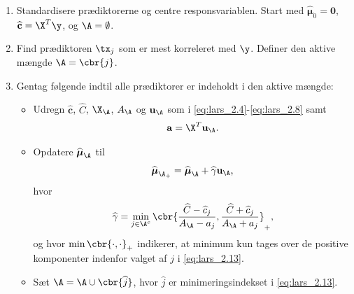\begin{alg} 
\begin{enumerate}
\item Standardisere prædiktorerne og centre responsvariablen. 
Start med \(\widehat{\boldsymbol{\mu}}_0 = \mathbf{0}\), \(\widehat{\mathbf{c}} = \X^T \y\), og \(\A = \emptyset\).
\item Find prædiktoren \(\tx_j\) som er mest korreleret med \(\y\). Definer den aktive mængde \(\A = \cbr{j}\).
\item 
Gentag følgende indtil alle prædiktorer er indeholdt i den aktive mængde:
\begin{itemize}
\item Udregn \(\widehat{\mathbf{c}}\), \(\widehat{C}\), \(\X_\A\), \(A_\A\) og \(\mathbf{u}_\A\) som i \eqref{eq:lars_2.4}-\eqref{eq:lars_2.8} samt
\begin{align*}
\mathbf{a} = \X^T \mathbf{u}_\A.
\end{align*}
\item Opdatere \(\widehat{\boldsymbol{\mu}}_\A\) til
\begin{align}
\widehat{\boldsymbol{\mu}}_{\A_+} = \widehat{\boldsymbol{\mu}}_\A + \widehat{\gamma} \mathbf{u}_\A, \label{eq:lars_2.12}
\end{align}
hvor 
\begin{align}
\widehat{\gamma} = \min_{j \in \A^c} \cbr{ \frac{\widehat{C}- \widehat{c}_j}{A_\A - a_j} , \frac{\widehat{C} + \widehat{c}_j}{A_\A + a_j}}_+, \label{eq:lars_2.13}
\end{align}
og hvor \(\min \cbr{\cdot , \cdot}_+\) indikerer, at minimum kun tages over de positive komponenter indenfor valget af \(j\) i \eqref{eq:lars_2.13}.
\item Sæt \(\A = \A \cup \cbr{\widehat{j}}\), hvor \(\widehat{j}\) er minimeringsindekset i \eqref{eq:lars_2.13}.
\end{itemize}
\end{enumerate}
\end{alg}
